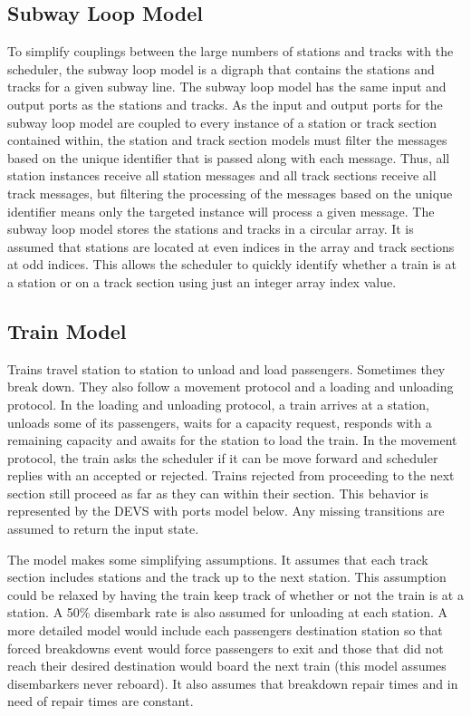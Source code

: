 \subsection{Subway Loop Model}

To simplify couplings between the large numbers of stations and tracks with the scheduler, the subway loop model is a digraph that contains the stations and tracks for a given subway line.  The subway loop model has the same input and output ports as the stations and tracks.  As the input and output ports for the subway loop model are coupled to every instance of a station or track section contained within, the station and track section models must filter the messages based on the unique identifier that is passed along with each message. Thus, all station instances receive all station messages and all track sections receive all track messages, but filtering the processing of the messages based on the unique identifier means only the targeted instance will process a given message. The subway loop model stores the stations and tracks in a circular array.  It is assumed that stations are located at even indices in the array and track sections at odd indices. This allows the scheduler to quickly identify whether a train is at a station or on a track section using just an integer array index value.

\subsection{Train Model}

Trains travel station to station to unload and load passengers. Sometimes they
break down. They also follow a movement protocol and a loading and unloading
protocol. In the loading and unloading protocol, a train arrives at a station,
unloads some of its passengers, waits for a capacity request, responds with a
remaining capacity and awaits for the station to load the train. In the movement
protocol, the train asks the scheduler if it can be move forward and scheduler
replies with an accepted or rejected. Trains rejected from proceeding to the
next section still proceed as far as they can within their section. This
behavior is represented by the DEVS with ports model below. Any missing
transitions are assumed to return the input state. 

The model makes some simplifying assumptions. It assumes that each track section
includes stations and the track up to the next station. This assumption could be
relaxed by having the train keep track of whether or not the train is at a
station. A 50\% disembark rate is also assumed for unloading at each station. A
more detailed model would include each passengers destination station so that
forced breakdowns event would force passengers to exit and those that did not
reach their desired destination would board the next train (this model assumes
disembarkers never reboard). It also assumes that breakdown repair times and in
need of repair times are constant.

